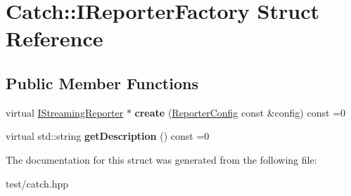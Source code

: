 \hypertarget{structCatch_1_1IReporterFactory}{}\section{Catch\+:\+:I\+Reporter\+Factory Struct Reference}
\label{structCatch_1_1IReporterFactory}
\subsection*{Public Member Functions}
\begin{DoxyCompactItemize}
\item 
virtual \hyperlink{structCatch_1_1IStreamingReporter}{I\+Streaming\+Reporter} $\ast$ {\bfseries create} (\hyperlink{structCatch_1_1ReporterConfig}{Reporter\+Config} const \&config) const =0\hypertarget{structCatch_1_1IReporterFactory_aa3c32d75432326148bf585212233a0bf}{}\label{structCatch_1_1IReporterFactory_aa3c32d75432326148bf585212233a0bf}

\item 
virtual std\+::string {\bfseries get\+Description} () const =0\hypertarget{structCatch_1_1IReporterFactory_a46880f93bd351d113d8189421928531b}{}\label{structCatch_1_1IReporterFactory_a46880f93bd351d113d8189421928531b}

\end{DoxyCompactItemize}


The documentation for this struct was generated from the following file\+:\begin{DoxyCompactItemize}
\item 
test/catch.\+hpp\end{DoxyCompactItemize}
